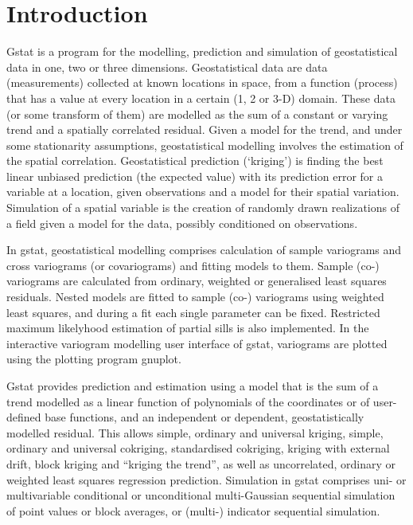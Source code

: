\documentclass[a4paper,12pt]{book}
\newif\ifpdf
\begin{document}




\tableofcontents

\chapter{Introduction}

Gstat is a program for the modelling, prediction and simulation of
geostatistical data in one, two or three dimensions. Geostatistical data
are data (measurements) collected at known locations in space, from a
function (process) that has a value at every location in a certain (1, 2
or 3-D) domain. These data (or some transform of them) are modelled as
the sum of a constant or varying trend and a spatially correlated
residual. Given a model for the trend, and under some stationarity
assumptions, geostatistical modelling involves the estimation of the
spatial correlation. Geostatistical prediction (`kriging') is finding
the best linear unbiased prediction (the expected value) with its
prediction error for a variable at a location, given observations and a
model for their spatial variation. Simulation of a spatial variable is
the creation of randomly drawn realizations of a field given a model for
the data, possibly conditioned on observations.

In gstat, geostatistical modelling comprises calculation of sample
variograms and cross variograms (or covariograms) and fitting models to
them. Sample (co-) variograms are calculated from ordinary, weighted or
generalised least squares residuals. Nested models are fitted to sample
(co-) variograms using weighted least squares, and during a fit each
single parameter can be fixed. Restricted maximum likelyhood estimation
of partial sills is also implemented. In the interactive variogram
modelling user interface of gstat, variograms are plotted using the
plotting program gnuplot.

Gstat provides prediction and estimation using a model that is the sum of
a trend modelled as a linear function of polynomials of the coordinates
or of user-defined base functions, and an independent or dependent,
geostatistically modelled residual. This allows simple, ordinary and
universal kriging, simple, ordinary and universal cokriging, standardised
cokriging, kriging with external drift, block kriging and ``kriging
the trend'', as well as uncorrelated, ordinary or weighted least squares
regression prediction. Simulation in gstat comprises uni- or multivariable
conditional or unconditional multi-Gaussian sequential simulation of point
values or block averages, or (multi-) indicator sequential simulation.
\end{document}
